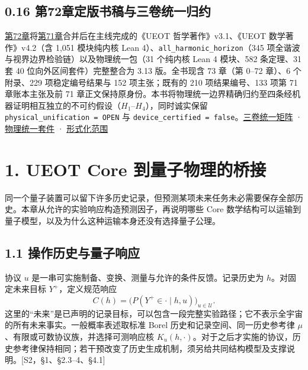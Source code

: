 \documentclass[
  11pt,
  oneside]{book}
\begin{document}
\section{0.16 第72章定版书稿与三卷统一归约}

\protect\hyperlink{ch-72}{第72章}将\href{https://github.com/MurphyHoops/UEOT/blob/cc5670d5f2ac96f8\allowbreak 8270c0f38ae6fb6f\allowbreak 77e26093/physics/qm/book/UEOT_PHYSICS.pdf}{第71章}合并后在主线完成的《UEOT
哲学著作》v3.1、《UEOT 数学著作》v4.2（含 1,051 模块纯内核 Lean
4）、\texttt{all\_\allowbreak harmonic\_\allowbreak horizon}（345
项全谐波与视界边界检验链）以及物理统一包（31 个纯内核 Lean 4 模块、582
条定理、31 套 40 位向外区间套件）完整整合为 3.13 版。全书现含 73 章（第
0--72 章）、6 个附录、229 项稳定编号结果与 152 项主张；既有的 210
项结果编号、133 项第 71 章账本主张及前 71
章正文保持原身份。本书将物理统一边界精确归约至四条经机器证明相互独立的不可约假设（\(H_1\)--\(H_4\)），同时诚实保留
\texttt{physical\_\allowbreak unification\ =\ OPEN} 与
\texttt{device\_\allowbreak certified\ =\ false}。\href{../../interfaces/PHILOSOPHY_MATHEMATICS_PHYSICS_UNIFICATION_MATRIX.md}{三卷统一矩阵}
· \href{../../unification/README.md}{物理统一套件} ·
\href{../../../formalization/ueot-physics-unification/README.md}{形式化范围}

\chapter{1. UEOT Core 到量子物理的桥接}\label{ch-1}\hypertarget{ch-1}{}

同一个量子装置可以留下许多历史记录，但预测某项未来任务未必需要保存全部历史。本章从允许的实验响应构造预测因子，再说明哪些
Core
数学结构可以运输到量子模型，以及为什么这种运输本身还没有选择量子公理。

\section{1.1 操作历史与量子响应}

协议 \(u\) 是一串可实施制备、变换、测量与允许的条件反馈。记录历史为
\(h\)。对固定未来目标 \(Y^+\)，定义规范响应 \[
C(h)=\bigl(P(Y^+\in\cdot\mid h,u)\bigr)_{u\in\mathcal U}.
\]
这里的``未来''是已声明的记录目标，可以包含一段完整实验路径；它不表示全宇宙的所有未来事实。一般概率表述取标准
Borel 历史和记录空间、同一历史参考律
\(\mu\)、有限或可数协议族，并选择可测响应核
\(K_u(h,\cdot)\)。对于之后才实施的协议，历史参考律保持相同；若干预改变了历史生成机制，须另给共同结构模型及支撑说明。{[}S2，§1、§2.3--4、§4.1{]}
\end{document}
